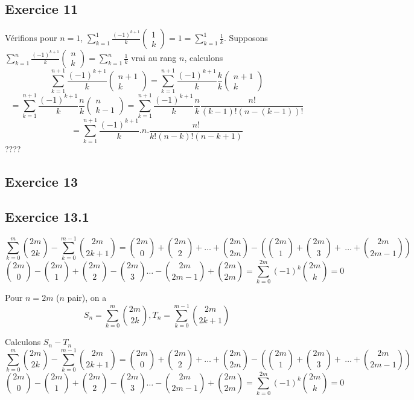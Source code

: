 \documentclass[]{book}
\theoremstyle{definition}
\begin{document}
\subsection*{Exercice 11}
V\'erifions pour $n=1$, $\sum_{k=1}^{1}\frac{(-1)^{k+1}}{k}\begin{pmatrix}1\\k\end{pmatrix} = 1 = \sum_{k=1}^{1} \frac{1}{k}$. Supposons $\sum_{k=1}^{n}\frac{(-1)^{k+1}}{k}\begin{pmatrix}n\\k\end{pmatrix} = \sum_{k=1}^{n}\frac{1}{k}$ vrai au rang $n$, calculons
$$\sum_{k=1}^{n+1}\frac{(-1)^{k+1}}{k}\begin{pmatrix}n+1\\k\end{pmatrix} = \sum_{k=1}^{n+1}\frac{(-1)^{k+1}}{k}\frac{k}{k}\begin{pmatrix}n+1\\k\end{pmatrix}$$
$$= \sum_{k=1}^{n+1}\frac{(-1)^{k+1}}{k}\frac{n}{k}\begin{pmatrix}n\\k-1\end{pmatrix} = \sum_{k=1}^{n+1}\frac{(-1)^{k+1}}{k}\frac{n}{k}\frac{n!}{(k-1)!(n-(k-1))!}$$
$$= \sum_{k=1}^{n+1}\frac{(-1)^{k+1}}{k}.n.\frac{n!}{k!(n-k)!(n-k+1)}$$
????

\subsection*{Exercice 13}
\subsection*{Exercice 13.1}$$\sum_{k=0}^{m}\binom{2m}{2k} - \sum_{k=0}^{m-1}\binom{2m}{2k+1} = \binom{2m}{0} + \binom{2m}{2} + \ldots + \binom{2m}{2m} - (\binom{2m}{1} + \binom{2m}{3} + \ \ldots + \binom{2m}{2m-1}) $$
$$\binom{2m}{0} - \binom{2m}{1} + \binom{2m}{2} - \binom{2m}{3} \ldots -\binom{2m}{2m-1} + \binom{2m}{2m}=  \sum_{k=0}^{2m} (-1)^k\binom{2m}{k} = 0$$

Pour $n=2m$ ($n$ pair), on a 
$$S_n = \sum_{k=0}^{m}\binom{2m}{2k}, T_n = \sum_{k=0}^{m-1}\binom{2m}{2k+1}$$

Calculons $S_n - T_n$
$$\sum_{k=0}^{m}\binom{2m}{2k} - \sum_{k=0}^{m-1}\binom{2m}{2k+1} = \binom{2m}{0} + \binom{2m}{2} + \ldots + \binom{2m}{2m} - \left(\binom{2m}{1} + \binom{2m}{3} + \ \ldots + \binom{2m}{2m-1}\right) $$
$$\binom{2m}{0} - \binom{2m}{1} + \binom{2m}{2} - \binom{2m}{3} \ldots -\binom{2m}{2m-1} + \binom{2m}{2m}=  \sum_{k=0}^{2m} (-1)^k\binom{2m}{k} = 0$$
\end{document}
